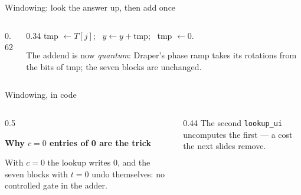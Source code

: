 \documentclass[aspectratio=169,11pt]{beamer}
\newcommand{\blocktitle}[1]{{\bfseries #1}\par\vskip1mm}
\newcommand{\code}[2][]{}
\newcommand{\bundle}[3]{\draw[thick,color=body] (#1-0.07,#2-0.13) -- (#1+0.07,#2+0.13);
  \node[font=\tiny,color=subtle,above right=-1pt] at (#1,#2) {#3};}
\begin{document}
\setcounter{framenumber}{53}
\begin{frame}[fragile]{Windowing: look the answer up, then add once}
  \begin{columns}[c]
    \begin{column}{0.62\textwidth}
      \centering
    \end{column}
    \begin{column}{0.34\textwidth}
      \small tmp $\leftarrow T[j]$; \ $y\leftarrow y+\text{tmp}$; \ tmp $\leftarrow0$.\par\vskip1mm
      The addend is now \emph{quantum}: Draper's phase ramp takes its rotations from the bits of tmp; the seven blocks are unchanged.
    \end{column}
  \end{columns}
  \code[basicstyle=\ttfamily\scriptsize]{add_quantum_mod.py}
\end{frame}

\setcounter{framenumber}{54}
\begin{frame}[fragile]{Windowing, in code}
  \code[basicstyle=\ttfamily\scriptsize]{windowed.py}
  \begin{columns}[T]
    \begin{column}{0.5\textwidth}
      \begin{greyblock}[fontupper=\small]
        \blocktitle{Why $c=0$ entries of 0 are the trick}
        With $c=0$ the lookup writes 0, and the seven blocks with $t=0$ undo themselves: no controlled gate in the adder.
      \end{greyblock}
    \end{column}
    \begin{column}{0.44\textwidth}
      \small The second \texttt{lookup\_ui} uncomputes the first --- a cost the next slides remove.
    \end{column}
  \end{columns}
\end{frame}
\end{document}
